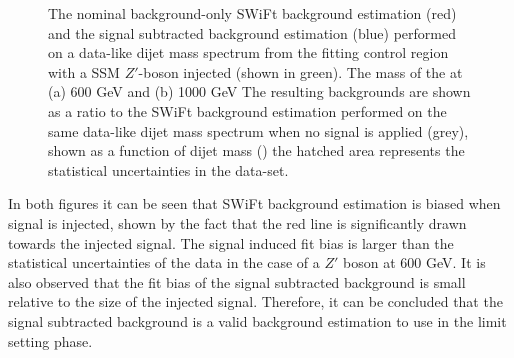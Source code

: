 \begin{figure}[!ht]
  \begin{center}
    \captionsetup[subfigure]{aboveskip=0pt,justification=centering}
  \end{center}
  \vspace{-1mm}
  \caption{The nominal background-only SWiFt background estimation (red) and the signal subtracted background estimation (blue) performed on a data-like
    dijet mass spectrum from the fitting control region with a SSM $Z'$-boson injected (shown in green).
    The mass of the at (a) 600 GeV and (b) 1000 GeV
    The resulting backgrounds are shown as a ratio to the SWiFt background estimation performed on the same data-like dijet mass spectrum when no signal is applied (grey),
    shown as a function of dijet mass (\mjj{})
    the hatched area represents the statistical uncertainties in the data-set.}
  \label{fig:lim-lowmass_ssb_test}
\end{figure}

In both figures it can be seen that SWiFt background estimation is biased when signal is injected,
shown by the fact that the red line is significantly drawn towards the injected signal.
The signal induced fit bias is larger than the statistical uncertainties of the data in the case of a $Z'$ boson at 600 GeV.
It is also observed that the fit bias of the signal subtracted background is small relative to the size of the injected signal.
Therefore, it can be concluded that the signal subtracted background is a valid background estimation to use in the limit setting phase.

